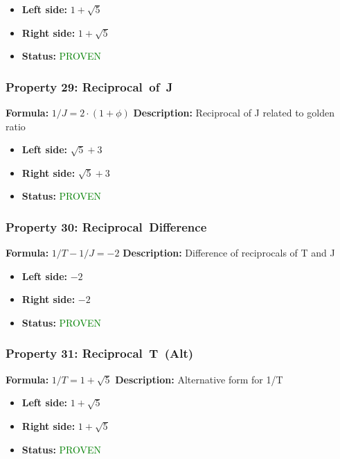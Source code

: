 \begin{itemize}
\item \textbf{Left side:} $1 + \sqrt{5}$
\item \textbf{Right side:} $1 + \sqrt{5}$
\item \textbf{Status:} \textcolor{green}{PROVEN}
\end{itemize}

\subsubsection*{Property 29: Reciprocal~of~J}
\textbf{Formula:} $1/J = 2 \cdot (1+\phi)$
\textbf{Description:} Reciprocal of J related to golden ratio

\begin{itemize}
\item \textbf{Left side:} $\sqrt{5} + 3$
\item \textbf{Right side:} $\sqrt{5} + 3$
\item \textbf{Status:} \textcolor{green}{PROVEN}
\end{itemize}

\subsubsection*{Property 30: Reciprocal~Difference}
\textbf{Formula:} $1/T - 1/J = -2$
\textbf{Description:} Difference of reciprocals of T and J

\begin{itemize}
\item \textbf{Left side:} $-2$
\item \textbf{Right side:} $-2$
\item \textbf{Status:} \textcolor{green}{PROVEN}
\end{itemize}

\subsubsection*{Property 31: Reciprocal~T~(Alt)}
\textbf{Formula:} $1/T = 1 + \sqrt{5}$
\textbf{Description:} Alternative form for 1/T

\begin{itemize}
\item \textbf{Left side:} $1 + \sqrt{5}$
\item \textbf{Right side:} $1 + \sqrt{5}$
\item \textbf{Status:} \textcolor{green}{PROVEN}
\end{itemize}

